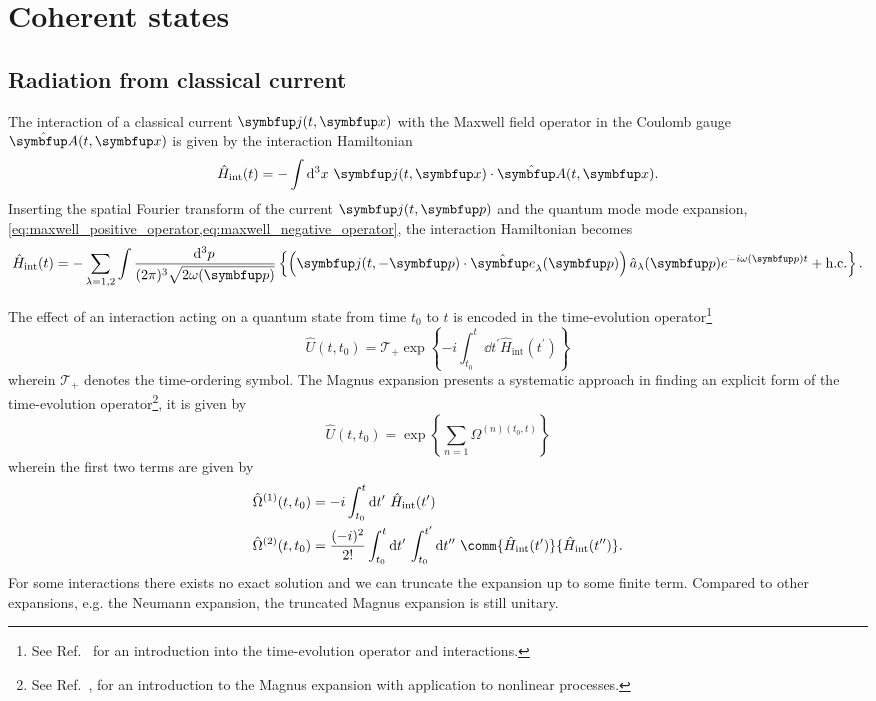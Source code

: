 \section{Coherent states}

\subsection{Radiation from classical current}

The interaction of a classical current $\vb{j}(t,\vb{x})$ with the Maxwell field operator in the Coulomb gauge $\vu{A}(t,\vb{x})$ is given by the interaction Hamiltonian
\begin{equation}
	\hat{H}_\text{int}(t)
	=
	-
	\int\dd[3]{x}
	\vb{j}(t,\vb{x})
	\vdot
	\hat{\vb{A}}(t,\vb{x})
	.
\end{equation}
Inserting the spatial Fourier transform of the current $\vb{j}(t,\vb{p})$ and the quantum mode mode expansion, \cref{eq:maxwell_positive_operator,eq:maxwell_negative_operator}, the interaction Hamiltonian becomes
\begin{equation}
	\hat{H}_\text{int}(t)
	=
	-
	\sum_{\lambda=1,2}
	\int\frac{\dd[3]{p}}{(2\pi)^3\sqrt{2\omega(\vb{p})}}
	\left\{
		\left(
			\vb{j}(t,-\vb{p})
			\vdot
			\vu{e}_\lambda(\vb{p})
		\right)
		\hat{a}_\lambda(\vb{p})
		e^{-i\omega(\vb{p})t}
		+
		\text{h.c.}
	\right\}
	.
\end{equation}

The effect of an interaction acting on a quantum state from time $t_0$ to $t$ is encoded in the time-evolution operator\footnote{See Ref.~\cite[p.~215]{Greiner2013} for an introduction into the time-evolution operator and interactions.}
\begin{equation}
	\hat{U}(t,t_0)
	=
	\mathcal{T}_+
	\exp\left\{
		-i
		\int_{t_0}^t\dd{t^\prime}
		\hat{H}_\text{int}(t^\prime)
	\right\}
	\label{eq:time_evolution_operator}
\end{equation}
wherein $\mathcal{T}_+$ denotes the time-ordering symbol.
The Magnus expansion presents a systematic approach in finding an explicit form of the time-evolution operator\footnote{See Ref.~\cite[p.~42]{QuesadaMejia2015}, for an introduction to the Magnus expansion with application to nonlinear processes.}, it is given by
\begin{equation}
	\hat{U}(t,t_0)
	=
	\exp\left\{
		\sum_{n=1}\Omega^{(n)(t_0,t)}
	\right\}
\end{equation}
wherein the first two terms are given by
\begin{align}
	\hat{\Omega}^{(1)}(t,t_0)
	&=
	-i
	\int_{t_0}^t\dd{t^\prime}
	\hat{H}_\text{int}(t^\prime)
	\\
	\hat{\Omega}^{(2)}(t,t_0)
	&=
	\frac{(-i)^2}{2!}
	\int_{t_0}^t\dd{t^\prime}
	\int_{t_0}^{t^\prime}\dd{t^{\prime\prime}}
	\comm{\hat{H}_\text{int}(t^\prime)}{\hat{H}_\text{int}(t^{\prime\prime})}
	.
\end{align}
For some interactions there exists no exact solution and we can truncate the expansion up to some finite term.
Compared to other expansions, e.g. the Neumann expansion, the truncated Magnus expansion is still unitary.

